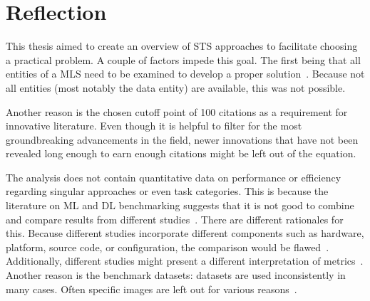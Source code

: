 \section{Reflection}
This thesis aimed to create an overview of \ac{STS} approaches to facilitate
choosing a practical problem.
A couple of factors impede this goal.
The first being that all entities of a \ac{MLS} need to be examined to develop a proper
solution~\citep{siebert_construction_2021,nakamichi_requirements-driven_2020}.
Because not all entities (most notably the data entity) are available, this was not possible.

Another reason is the chosen cutoff point of 100 citations as a requirement for innovative literature.
Even though it is helpful to filter for the most groundbreaking advancements in the field,
newer innovations that have not been revealed long enough to earn enough citations might be left
out of the equation.

The analysis does not contain quantitative data on performance or efficiency regarding
singular approaches or even task categories.
This is because the literature on \ac{ML} and \ac{DL} benchmarking suggests that it is not good
to combine and compare results from different
studies~\citep{baek_what_2019,arpteg_software_2018,long_scene_2021}.
There are different rationales for this.
Because different studies incorporate different components such as hardware, platform, source code,
or configuration, the comparison would be flawed~\citep{arpteg_software_2018,baek_what_2019}.
Additionally, different studies might present a different interpretation of
metrics~\citep{long_scene_2021}.
Another reason is the benchmark datasets: datasets are used inconsistently in
many cases.
Often specific images are left out for various reasons~\citep{baek_what_2019}.
